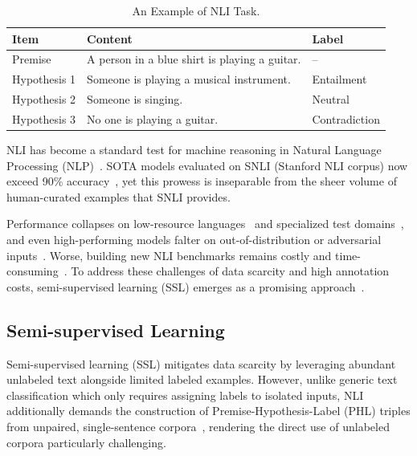 \documentclass[lettersize,journal]{IEEEtran}
\begin{document}
\begin{table}[h]
	\caption{An Example of NLI Task.}
	\label{tab:nli_examples}
	\centering
	\footnotesize
	\renewcommand{\arraystretch}{0.95}
	\setlength{\tabcolsep}{4pt}
	\begin{tabular}{>{\raggedright\arraybackslash}p{}
			>{\raggedright\arraybackslash}p{}
			>{\centering\arraybackslash}p{}}
		\toprule
		\textbf{Item} & \textbf{Content} & \textbf{Label} \\
		\midrule
		Premise & A person in a blue shirt is playing a guitar. & -- \\
		\midrule
		Hypothesis 1 & Someone is playing a musical instrument. & Entailment \\
		Hypothesis 2 & Someone is singing. & Neutral \\
		Hypothesis 3 & No one is playing a guitar. & Contradiction \\
		\bottomrule
	\end{tabular}
\end{table}



NLI has become a standard test for machine reasoning in Natural Language Processing (NLP)~\cite{DBLP:conf/icml/CollobertW08}. 
SOTA models evaluated on SNLI (Stanford NLI corpus) now exceed 90\% accuracy~\cite{DBLP:conf/icann/GajbhiyeMB21}, yet this prowess is inseparable from the sheer volume of human-curated examples that SNLI provides.

Performance collapses on low-resource languages~\cite{conneau-etal-2018-xnli} and specialized test domains~\cite{naik-etal-2018-stress}, and even high-performing models falter on out-of-distribution or adversarial inputs~\cite{hendrycks-etal-2020-pretrained, tian-etal-2021-diagnosing, mccoy-etal-2019-right, gururangan-etal-2018-annotation}. Worse, building new NLI benchmarks remains costly and time-consuming~\cite{nie-etal-2020-adversarial, DBLP:conf/acl/VarshneyBGB22,DBLP:conf/naacl/WilliamsNB18}. To address these challenges of data scarcity and high annotation costs, semi-supervised learning (SSL) emerges as a promising approach~\cite{DBLP:conf/emnlp/ParkC24,DBLP:conf/acl/VarshneyBGB22,DBLP:conf/emnlp/SadatC22a}.


\subsection{Semi-supervised Learning}
Semi-supervised learning (SSL) mitigates data scarcity by leveraging abundant unlabeled text alongside limited labeled examples. However, unlike generic text classification which only requires assigning labels to isolated inputs, NLI additionally demands the construction of Premise-Hypothesis-Label (PHL) triples from unpaired, single-sentence corpora~\cite{DBLP:conf/acl/VarshneyBGB22}, rendering the direct use of unlabeled corpora particularly challenging.
\end{document}
